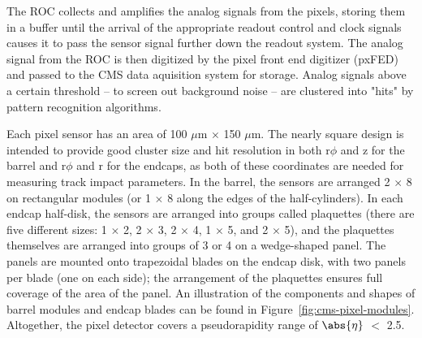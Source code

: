 The ROC collects and amplifies the analog signals from the pixels, storing them in a buffer until the arrival of the appropriate readout control and clock signals causes it to pass the sensor signal further down the readout system. The analog signal from the ROC is then digitized by the pixel front end digitizer (pxFED) and passed to the CMS data aquisition system for storage. Analog signals above a certain threshold -- to screen out background noise -- are clustered into "hits" by pattern recognition algorithms.

Each pixel sensor has an area of 100 $\mu$m $\times$ 150 $\mu$m. The nearly square design is intended to provide good cluster size and hit resolution in both r$\phi$ and z for the barrel and r$\phi$ and r for the endcaps, as both of these coordinates are needed for measuring track impact parameters. In the barrel, the sensors are arranged 2 $\times$ 8 on rectangular modules (or 1 $\times$ 8 along the edges of the half-cylinders). In each endcap half-disk, the sensors are arranged into groups called plaquettes (there are five different sizes: 1 $\times$ 2, 2 $\times$ 3, 2 $\times$ 4, 1 $\times$ 5, and 2 $\times$ 5), and the plaquettes themselves are arranged into groups of 3 or 4 on a wedge-shaped panel. The panels are mounted onto trapezoidal blades on the endcap disk, with two panels per blade (one on each side); the arrangement of the plaquettes ensures full coverage of the area of the panel. An illustration of the components and shapes of barrel modules and endcap blades can be found in Figure~\ref{fig:cms-pixel-modules}. Altogether, the pixel detector covers a pseudorapidity range of $\abs{\eta}$ $<$ 2.5.

